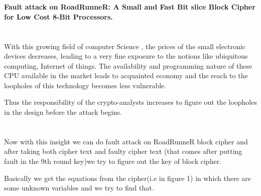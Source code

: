 \section*{\fontsize{25}{29}\selectfont{\textbf Introduction} \\}
\fontsize{20}{24}\selectfont{\color{red} {TITLE:  }}
\Large\textbf{{Fault attack on RoadRunneR: A Small and Fast Bit slice Block Cipher for Low Cost 8-Bit Processors.}}

\section*{\fontsize{20}{24}\selectfont{\color{purple} {Motivation:  }}}

\paragraph{}With this growing field of computer Science , the prices of the small electronic devices decreases, leading to a very fine exposure to the notions like ubiquitous computing, Internet of things. The availability and programming nature of these CPU available in the market leads to  acquainted economy and the reach to the loopholes of this technology becomes less vulnerable.

Thus the responsibility of the crypto-analysts increases to figure out the loopholes in the design before the attack begins.

\section*{\fontsize{20}{24}\selectfont{\color{purple} {Problem Statement:  }}}

Now with this insight we can do fault attack on RoadRunneR block cipher and after taking both cipher text and faulty cipher text (that comes after putting fault in the 9th round key)we try to figure out the key of block cipher.

Basically we get the equations from the cipher(i.e in figure 1) in which there are some unknown variables and we try to find that. \\


